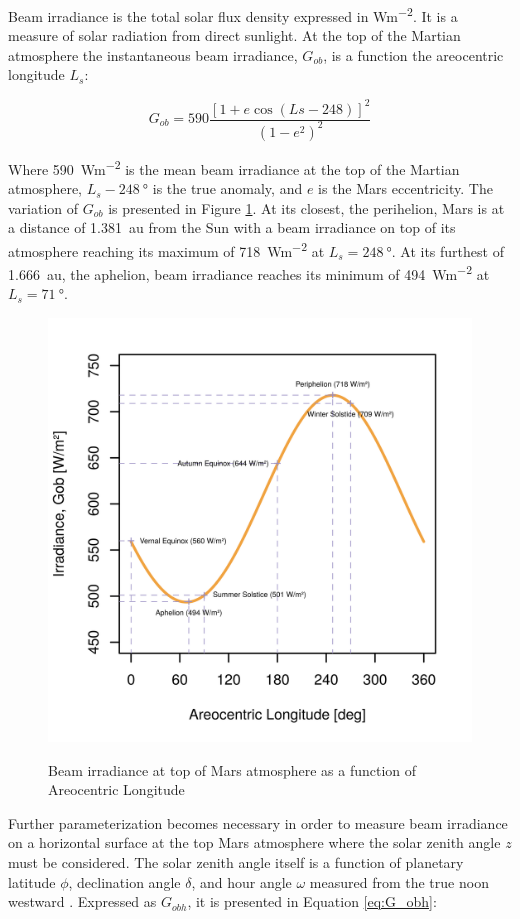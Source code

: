 Beam irradiance is the total solar flux density expressed in \si{Wm^{-2}}. It is a measure of solar radiation from direct sunlight. At the top of the Martian atmosphere the instantaneous beam irradiance, $G_{ob}$, is a function the areocentric longitude $L_{s}$:

\begin{equation}
  \label{eq:G_ob}
  G_{ob} = 590 \frac{[1 + e \cos{(Ls - 248)}]^2}{(1-e^2)^2}
\end{equation}

Where \SI{590}{Wm^{-2}} is the mean beam irradiance at the top of the Martian atmosphere, $L_{s} - \SI{248}{\degree}$ is the true anomaly, and $e$ is the Mars eccentricity. The variation of $G_{ob}$ is presented in Figure \ref{fig:plot:beam-irradiance-top-of-mars-atmosphere}. At its closest, the perihelion, Mars is at a distance of \SI{1.381}{\astronomicalunit} from the Sun with a beam irradiance on top of its atmosphere reaching its maximum of \SI{718}{Wm^{-2}} at $L_{s} = \SI{248}{\degree}$. At its furthest of \SI{1.666}{\astronomicalunit}, the aphelion, beam irradiance reaches its minimum of \SI{494}{Wm^{-2}} at $L_{s} = \SI{71}{\degree}$.

\begin{figure}[H]
  \centering
  \hypersetup{linkcolor=captionTextColor}
  \includegraphics[width=0.5\linewidth]{sections/mars-solar-energy/solar-radiation/plots/gob-daily-variations.png}\\
  \caption[Beam irradiance at top of Mars atmosphere as a function of Areocentric Longitude]
          {Beam irradiance at top of Mars atmosphere as a function of Areocentric Longitude}
  \label{fig:plot:beam-irradiance-top-of-mars-atmosphere}
\end{figure}

Further parameterization becomes necessary in order to measure beam irradiance on a horizontal surface at the top Mars atmosphere where the solar zenith angle $z$ must be considered. The solar zenith angle itself is a function of planetary latitude $\phi$, declination angle $\delta$, and hour angle $\omega$ measured from the true noon westward . Expressed as $G_{obh}$, it is presented in Equation \ref{eq:G_obh}:

